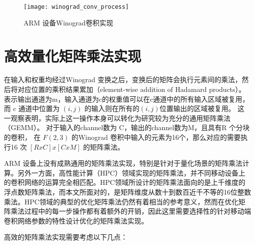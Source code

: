 \begin{figure}
\centering
\texttt{[image: winograd\_conv\_process]}
\caption{ARM 设备Winograd卷积实现}
\label{fig:winograd_full_procedure}
\end{figure}

\section{高效量化矩阵乘法实现}

在输入和权重均经过Winograd 变换之后，变换后的矩阵会执行元素间的乘法，然后将对应位置的乘积结果累加（element-wise addition of Hadamard products）。
表示输出通道为m，输入通道为c的权重值可以在c通道中的所有输入区域被复用，
而 c 通道中位置为 $(i, j)$ 的输入则在所有的$(i,j )$位置输出的区域被复用。 这一观察表明，实际上这一操作本身可以转化为研究较为充分的通用矩阵乘法（GEMM）。
对于输入的channel数为 C，输出的channel数为M，且具有R 个分块的卷积， 在 $F(2, 3)$ 的Winograd 卷积中输入的元素为16个，那么对应的需要执行16 次 $[RxC]x[CxM] $
的矩阵乘法。

ARM 设备上没有成熟通用的矩阵乘法实现，特别是针对于量化场景的矩阵乘法计算。另外一方面，高性能计算（HPC）领域实现的矩阵乘法，并不同移动设备上的卷积网络的运算完全相匹配。HPC领域所设计的矩阵乘法面向的是上千维度的浮点数矩阵乘法，而本文所面对的，是矩阵维度从数十到数百近千不等的16位整数乘法。HPC领域的典型的优化矩阵乘法仍然有着相当的参考意义，然而在优化矩阵乘法过程中的每一步操作都有着额外的开销，因此这里需要选择性的针对移动端卷积网络参数的特性设计优化的矩阵乘法实现。

高效的矩阵乘法实现需要考虑以下几点：

